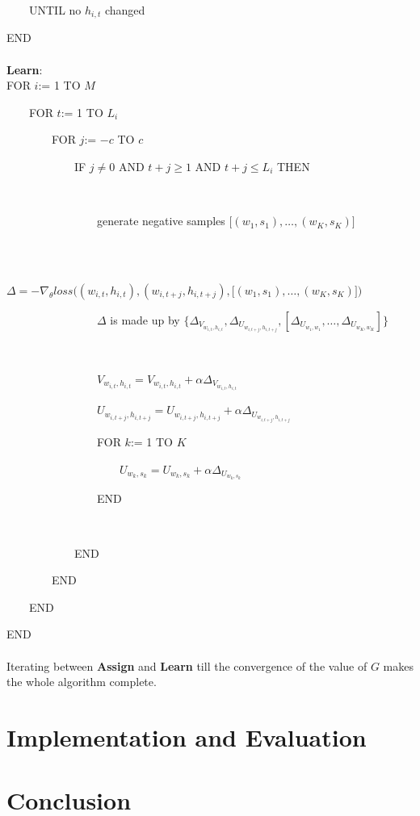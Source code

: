 \documentclass[12pt,a4paper,twoside]{book}
\begin{document}
\ \ \ \ UNTIL no $h_{i,t}$ changed

END
\paragraph{} \textbf{Learn}:\\

FOR $i$:= 1 TO $M$

\ \ \ \ FOR $t$:= 1 TO $L_i$

\ \ \ \ \ \ \ \ FOR $j$:= $-c$ TO $c$

\ \ \ \ \ \ \ \ \ \ \ \ IF $j\neq 0$ AND $t+j\geq1$ AND $t+j\leq L_i$ THEN

\ \ \ \ \ \ \ \ \ \ \ \ \ \ \ \

\ \ \ \ \ \ \ \ \ \ \ \ \ \ \ \ generate negative samples $\big [(w_1,s_1),\ldots,(w_K,s_K)\big ]$

\ \ \ \ \ \ \ \ \ \ \ \ \ \ \ \

\ \ \ \ \ \ \ \ \ \ \ \ \ \ \ \ $\Delta = -\nabla_\theta loss\bigg ( (w_{i,t},h_{i,t}),(w_{i,t+j},h_{i,t+j}),\big [(w_1,s_1),\ldots,(w_K,s_K)\big ]\bigg )$

\ \ \ \ \ \ \ \ \ \ \ \ \ \ \ \ $\Delta$ is made up by $ \{\Delta_{V_{w_{i,t},h_{i,t}}}, \Delta_{U_{w_{i,t+j},h_{i,t+j}}}, [\Delta_{U_{w_1,w_1}},\ldots,\Delta_{U_{w_K,w_K}}]\}$

\ \ \ \ \ \ \ \ \ \ \ \ \ \ \ \

\ \ \ \ \ \ \ \ \ \ \ \ \ \ \ \ $V_{w_{i,t},h_{i,t}} = V_{w_{i,t},h_{i,t}} + \alpha \Delta_{V_{w_{i,t},h_{i,t}}}$
 
\ \ \ \ \ \ \ \ \ \ \ \ \ \ \ \ $U_{w_{i,t+j},h_{i,t+j}} = U_{w_{i,t+j},h_{i,t+j}} + \alpha \Delta_{U_{w_{i,t+j},h_{i,t+j}}}$ 

\ \ \ \ \ \ \ \ \ \ \ \ \ \ \ \ FOR $k$:= 1 TO $K$

\ \ \ \ \ \ \ \ \ \ \ \ \ \ \ \ \ \ \ \ $U_{w_k,s_k} = U_{w_k,s_k} + \alpha \Delta_{U_{w_k,s_k}}$ 

\ \ \ \ \ \ \ \ \ \ \ \ \ \ \ \ END

\ \ \ \ \ \ \ \ \ \ \ \ \ \ \ \
 
\ \ \ \ \ \ \ \ \ \ \ \ END 

\ \ \ \ \ \ \ \  END

\ \ \ \ END

END

\paragraph{}
Iterating between \textbf{Assign} and \textbf{Learn} till the convergence of the value of $G$ makes the whole algorithm complete. 

\section{Implementation and Evaluation}

\section{Conclusion}
\end{document}
